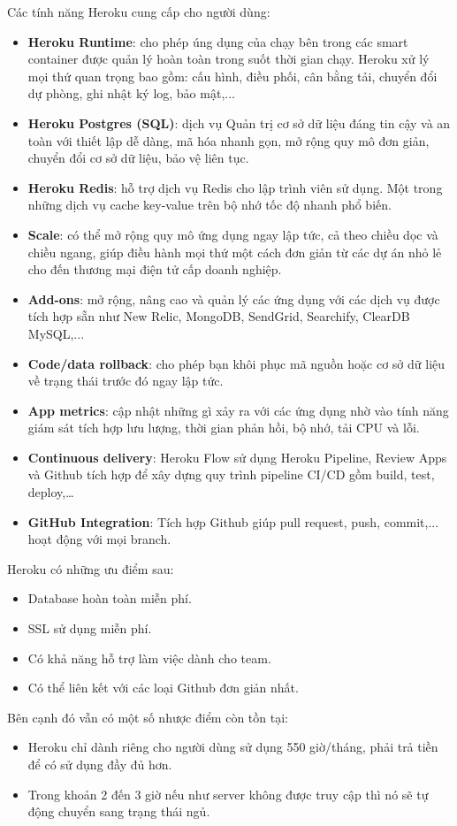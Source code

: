 Các tính năng Heroku cung cấp cho người dùng:
\begin{itemize}
    \item \textbf{Heroku Runtime}: cho phép úng dụng của chạy bên trong các smart container được quản lý hoàn toàn trong suốt thời gian chạy. Heroku xử lý mọi thứ quan trọng bao gồm: cấu hình, điều phối, cân bằng tải, chuyển đổi dự phòng, ghi nhật ký log, bảo mật,...
    \item \textbf{Heroku Postgres (SQL)}: dịch vụ Quản trị cơ sở dữ liệu đáng tin cậy và an toàn với thiết lập dễ dàng, mã hóa nhanh gọn, mở rộng quy mô đơn giản, chuyển đổi cơ sở dữ liệu, bảo vệ liên tục.
    \item \textbf{Heroku Redis}: hỗ trợ dịch vụ Redis cho lập trình viên sử dụng. Một trong những dịch vụ cache key-value trên bộ nhớ tốc độ nhanh phổ biến.
    \item \textbf{Scale}: có thể mở rộng quy mô ứng dụng ngay lập tức, cả theo chiều dọc và chiều ngang, giúp điều hành mọi thứ một cách đơn giản từ các dự án nhỏ lẻ cho đến thương mại điện tử cấp doanh nghiệp.
    \item \textbf{Add-ons}: mở rộng, nâng cao và quản lý các ứng dụng với các dịch vụ được tích hợp sẵn như New Relic, MongoDB, SendGrid, Searchify, ClearDB MySQL,...
    \item \textbf{Code/data rollback}: cho phép bạn khôi phục mã nguồn hoặc cơ sở dữ liệu về trạng thái trước đó ngay lập tức.
    \item \textbf{App metrics}: cập nhật những gì xảy ra với các ứng dụng nhờ vào tính năng giám sát tích hợp lưu lượng, thời gian phản hồi, bộ nhớ, tải CPU và lỗi.
    \item \textbf{Continuous delivery}: Heroku Flow sử dụng Heroku Pipeline, Review Apps và Github tích hợp để xây dựng quy trình pipeline CI/CD gồm build, test, deploy,…
    \item \textbf{GitHub Integration}: Tích hợp Github giúp pull request, push, commit,... hoạt động với mọi branch.
\end{itemize}

\noindent
Heroku có những ưu điểm sau:
\begin{itemize}
    \item Database hoàn toàn miễn phí.
    \item SSL sử dụng miễn phí.
    \item Có khả năng hỗ trợ làm việc dành cho team.
    \item Có thể liên kết với các loại Github đơn giản nhất.
\end{itemize}

\noindent
Bên cạnh đó vẫn có một số nhược điểm còn tồn tại:
\begin{itemize}
    \item Heroku chỉ dành riêng cho người dùng sử dụng 550 giờ/tháng, phải trả tiền để có sử dụng đầy đủ hơn.
    \item Trong khoản 2 đến 3 giờ nếu như server không được truy cập thì nó sẽ tự động chuyển sang trạng thái ngủ.
\end{itemize}